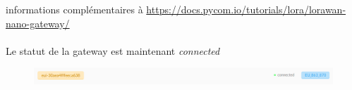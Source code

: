 \documentclass{article}
\begin{document}
informations complémentaires à \url{ https://docs.pycom.io/tutorials/lora/lorawan-nano-gateway/}\\\\

Le statut de la gateway est maintenant \textit{connected}

\begin{figure}[H]
\begin{center}
\advance\leftskip-3cm
\advance\rightskip-3cm
\includegraphics[keepaspectratio=true,scale=0.4]{gateway_connected.png}
\label{visina8}
\end{center}\end{figure}
\end{document}
